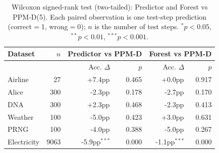 \begin{table}[h]
\centering
\caption{Wilcoxon signed-rank test (two-tailed): Predictor and Forest vs PPM-D(5). Each paired observation is one test-step prediction (correct$=$1, wrong$=$0); $n$ is the number of test steps. $^*p{<}0.05$, $^{**}p{<}0.01$, $^{***}p{<}0.001$.}
\label{tab:significance}
\begin{tabular}{l r rr rr}
\toprule
Dataset & $n$ & \multicolumn{2}{c}{Predictor vs PPM-D} & \multicolumn{2}{c}{Forest vs PPM-D} \\
\midrule
 & & Acc. $\Delta$ & $p$ & Acc. $\Delta$ & $p$ \\
\midrule
Airline & 27 & +7.4pp$^{}$ & 0.465 & +0.0pp$^{}$ & 0.917 \\
Alice & 300 & -2.3pp$^{}$ & 0.178 & -2.7pp$^{}$ & 0.170 \\
DNA & 300 & +2.3pp$^{}$ & 0.468 & -2.3pp$^{}$ & 0.413 \\
Weather & 100 & -5.0pp$^{}$ & 0.423 & +3.0pp$^{}$ & 0.631 \\
PRNG & 100 & -4.0pp$^{}$ & 0.388 & -5.0pp$^{}$ & 0.267 \\
Electricity & 9063 & -5.9pp$^{***}$ & 0.000 & -1.1pp$^{***}$ & 0.000 \\
\bottomrule
\end{tabular}
\end{table}
